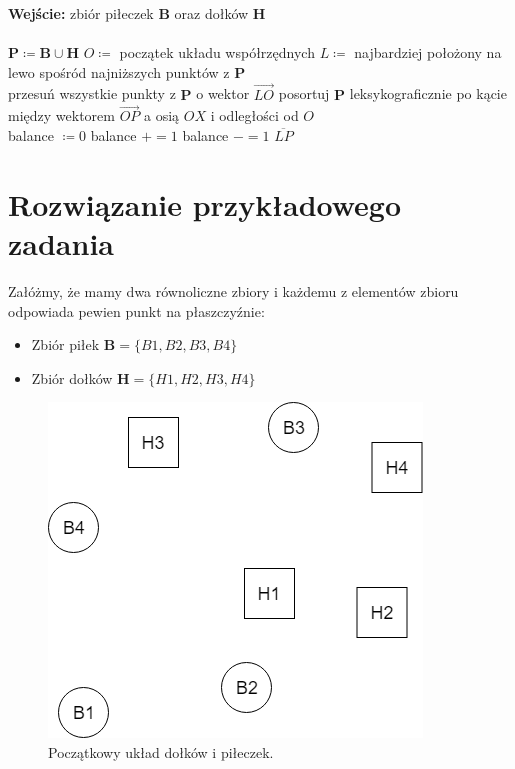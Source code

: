 \documentclass[10pt,a4paper]{article}
\begin{document}
	\begin{algorithmic}
		\State \textbf{Wejście:} zbiór piłeczek $\mathbf{B}$ oraz dołków $\mathbf{H}$  \\
		
		\\
			\State $\mathbf{P} \coloneqq \mathbf{B} \cup \mathbf{H}$ 
			\State $O \coloneqq$ początek układu współrzędnych
			\State $L \coloneqq$ najbardziej położony na lewo spośród najniższych punktów z $\mathbf{P}$ 
			\\
			\State przesuń wszystkie punkty z $\mathbf{P}$ o wektor $\overrightarrow{LO}$ 
			\State posortuj $\mathbf{P}$ leksykograficznie po kącie między wektorem $\overrightarrow{OP}$ a osią $OX$ i odległości od $O$  
			\\
			\State balance $\coloneqq 0$
			  
					\State balance $\mathrel{{+}{=}} 1$
				\Else
					\State balance $\mathrel{{-}{=}} 1$
				\EndIf
					\State \Return $\overline{LP}$
				\EndIf
			\EndFor\\
		\EndFunction
	\end{algorithmic}
	
	\section{Rozwiązanie przykładowego zadania}
	
	Załóżmy, że mamy dwa równoliczne zbiory i każdemu z elementów zbioru odpowiada pewien punkt na płaszczyźnie:
	
	\begin{itemize}
		\item Zbiór piłek $\mathbf{B} = \{B1, B2, B3, B4\}$ 
		\item Zbiór dołków $\mathbf{H} = \{H1, H2, H3, H4\}$ 
	\end{itemize}

	\begin{figure}[H]
		\centering
 			\includegraphics[scale=0.5]{images/step1.png}
 		 	\caption{Początkowy układ dołków i piłeczek.}
 		\label{fig:step1}
	\end{figure}
	
\end{document}
